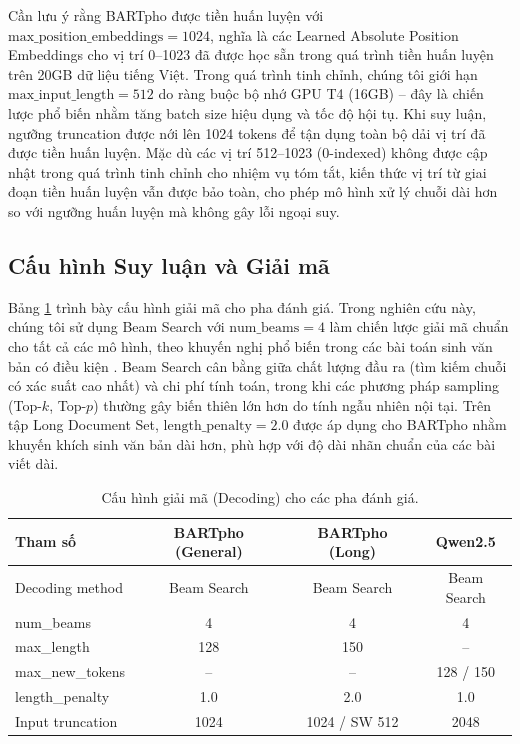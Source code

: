 \documentclass{article}
\begin{document}
Cần lưu ý rằng BARTpho được tiền huấn luyện với $\text{max\_position\_embeddings} = 1024$, nghĩa là các Learned Absolute Position Embeddings cho vị trí 0--1023 đã được học sẵn trong quá trình tiền huấn luyện trên 20GB dữ liệu tiếng Việt. Trong quá trình tinh chỉnh, chúng tôi giới hạn $\text{max\_input\_length} = 512$ do ràng buộc bộ nhớ GPU T4 (16GB) -- đây là chiến lược phổ biến nhằm tăng batch size hiệu dụng và tốc độ hội tụ. Khi suy luận, ngưỡng truncation được nới lên 1024 tokens để tận dụng toàn bộ dải vị trí đã được tiền huấn luyện. Mặc dù các vị trí 512--1023 (0-indexed) không được cập nhật trong quá trình tinh chỉnh cho nhiệm vụ tóm tắt, kiến thức vị trí từ giai đoạn tiền huấn luyện vẫn được bảo toàn, cho phép mô hình xử lý chuỗi dài hơn so với ngưỡng huấn luyện mà không gây lỗi ngoại suy.

\subsection{Cấu hình Suy luận và Giải mã}

Bảng \ref{tab:decoding_config} trình bày cấu hình giải mã cho pha đánh giá. Trong nghiên cứu này, chúng tôi sử dụng Beam Search với $\text{num\_beams} = 4$ làm chiến lược giải mã chuẩn cho tất cả các mô hình, theo khuyến nghị phổ biến trong các bài toán sinh văn bản có điều kiện \cite{bart_original}. Beam Search cân bằng giữa chất lượng đầu ra (tìm kiếm chuỗi có xác suất cao nhất) và chi phí tính toán, trong khi các phương pháp sampling (Top-$k$, Top-$p$) thường gây biến thiên lớn hơn do tính ngẫu nhiên nội tại. Trên tập Long Document Set, $\text{length\_penalty} = 2.0$ được áp dụng cho BARTpho nhằm khuyến khích sinh văn bản dài hơn, phù hợp với độ dài nhãn chuẩn của các bài viết dài.

\begin{table}[H]
\centering
\caption{Cấu hình giải mã (Decoding) cho các pha đánh giá.}
\label{tab:decoding_config}
\begin{tabular}{@{}lccc@{}}
\toprule
\textbf{Tham số} & \textbf{BARTpho (General)} & \textbf{BARTpho (Long)} & \textbf{Qwen2.5} \\
\midrule
Decoding method     & Beam Search & Beam Search & Beam Search \\
num\_beams          & 4 & 4 & 4 \\
max\_length         & 128 & 150 & -- \\
max\_new\_tokens    & -- & -- & 128 / 150 \\
length\_penalty     & 1.0 & 2.0 & 1.0 \\
Input truncation    & 1024 & 1024 / SW 512 & 2048 \\
\bottomrule
\end{tabular}
\end{table}
\end{document}
